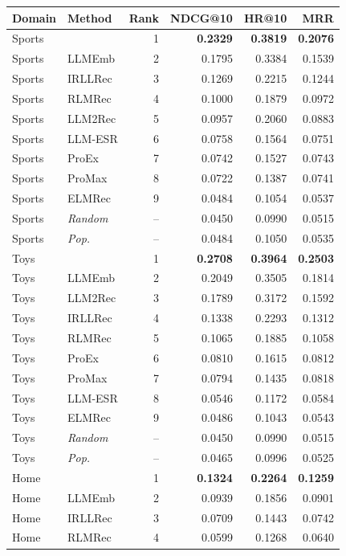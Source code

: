 \begin{table}[t]
\begin{minipage}[t]{0.49\textwidth}
\centering
\begin{tabular}{llrrrr}
\toprule
Domain & Method & Rank & NDCG@10 & HR@10 & MRR \\
\midrule
Sports & \method{} & 1 & \textbf{0.2329} & \textbf{0.3819} & \textbf{0.2076} \\
Sports & LLMEmb & 2 & 0.1795 & 0.3384 & 0.1539 \\
Sports & IRLLRec & 3 & 0.1269 & 0.2215 & 0.1244 \\
Sports & RLMRec & 4 & 0.1000 & 0.1879 & 0.0972 \\
Sports & LLM2Rec & 5 & 0.0957 & 0.2060 & 0.0883 \\
Sports & LLM-ESR & 6 & 0.0758 & 0.1564 & 0.0751 \\
Sports & ProEx & 7 & 0.0742 & 0.1527 & 0.0743 \\
Sports & ProMax & 8 & 0.0722 & 0.1387 & 0.0741 \\
Sports & ELMRec & 9 & 0.0484 & 0.1054 & 0.0537 \\
Sports & \textit{Random} & -- & 0.0450 & 0.0990 & 0.0515 \\
Sports & \textit{Pop.} & -- & 0.0484 & 0.1050 & 0.0535 \\
\midrule
Toys & \method{} & 1 & \textbf{0.2708} & \textbf{0.3964} & \textbf{0.2503} \\
Toys & LLMEmb & 2 & 0.2049 & 0.3505 & 0.1814 \\
Toys & LLM2Rec & 3 & 0.1789 & 0.3172 & 0.1592 \\
Toys & IRLLRec & 4 & 0.1338 & 0.2293 & 0.1312 \\
Toys & RLMRec & 5 & 0.1065 & 0.1885 & 0.1058 \\
Toys & ProEx & 6 & 0.0810 & 0.1615 & 0.0812 \\
Toys & ProMax & 7 & 0.0794 & 0.1435 & 0.0818 \\
Toys & LLM-ESR & 8 & 0.0546 & 0.1172 & 0.0584 \\
Toys & ELMRec & 9 & 0.0486 & 0.1043 & 0.0543 \\
Toys & \textit{Random} & -- & 0.0450 & 0.0990 & 0.0515 \\
Toys & \textit{Pop.} & -- & 0.0465 & 0.0996 & 0.0525 \\
\midrule
Home & \method{} & 1 & \textbf{0.1324} & \textbf{0.2264} & \textbf{0.1259} \\
Home & LLMEmb & 2 & 0.0939 & 0.1856 & 0.0901 \\
Home & IRLLRec & 3 & 0.0709 & 0.1443 & 0.0742 \\
Home & RLMRec & 4 & 0.0599 & 0.1268 & 0.0640 \\

\end{tabular}
\end{minipage}
\end{table}
